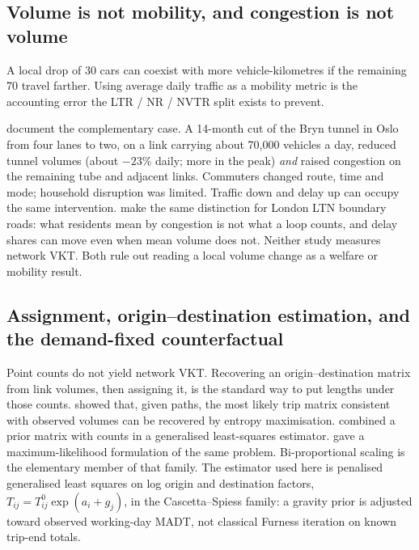 \documentclass[a4paper,fleqn]{cas-dc}
\begin{document}
\subsection{Volume is not mobility, and congestion is not volume}

A local drop of 30 cars can coexist with more vehicle-kilometres if the
remaining 70 travel farther. Using average daily traffic as a mobility metric
is the accounting error the LTR / NR / NVTR split exists to prevent.

\citet{Tennoy2021} document the complementary case. A 14-month cut of the Bryn
tunnel in Oslo from four lanes to two, on a link carrying about 70{,}000
vehicles a day, reduced tunnel volumes (about $-23\%$ daily; more in the peak)
\emph{and} raised congestion on the remaining tube and adjacent links.
Commuters changed route, time and mode; household disruption was limited.
Traffic down and delay up can occupy the same intervention.
\citet{Verlinghieri2025} make the same distinction for London LTN boundary
roads: what residents mean by congestion is not what a loop counts, and delay
shares can move even when mean volume does not. Neither study measures network
VKT. Both rule out reading a local volume change as a welfare or mobility
result.

\subsection{Assignment, origin--destination estimation, and the demand-fixed counterfactual}

Point counts do not yield network VKT. Recovering an origin--destination
matrix from link volumes, then assigning it, is the standard way to put
lengths under those counts. \citet{VanZuylen1980} showed that, given paths,
the most likely trip matrix consistent with observed volumes can be recovered
by entropy maximisation. \citet{Cascetta1984} combined a prior matrix with
counts in a generalised least-squares estimator. \citet{Spiess1987} gave a
maximum-likelihood formulation of the same problem. Bi-proportional scaling
\citep{Furness1965} is the elementary member of that family. The estimator
used here is penalised generalised least squares on log origin and
destination factors, $T_{ij}=T_{ij}^{0}\exp(a_i+g_j)$, in the
Cascetta--Spiess family: a gravity prior is adjusted toward observed
working-day MADT, not classical Furness iteration on known trip-end totals.
\end{document}
